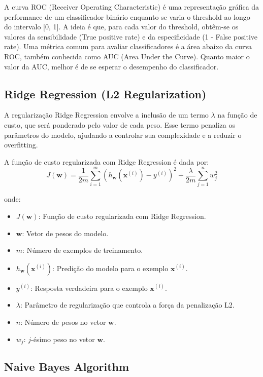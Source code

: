 \documentclass[conference]{IEEEtran}
\begin{document}
A curva ROC (Receiver Operating Characteristic) é uma representação gráfica da performance de um classificador binário enquanto se varia o threshold ao longo do intervalo [0, 1]. A ideia é que, para cada valor do threshold, obtêm-se os valores da sensibilidade (True positive rate) e da especificidade (1 - False positive rate). Uma métrica comum para avaliar classificadores é a área abaixo da curva ROC, também conhecida como AUC (Area Under the Curve). Quanto maior o valor da AUC, melhor é de se esperar o desempenho do classificador.


\subsection{Ridge Regression (L2 Regularization)}

A regularização Ridge Regression envolve a inclusão de um termo \(\lambda \) na função de custo, que será ponderado pelo valor de cada peso. Esse termo penaliza os parâmetros do modelo, ajudando a controlar sua complexidade e a reduzir o overfitting.

A função de custo regularizada com Ridge Regression é dada por:
\[ J(\mathbf{w}) = \frac{1}{2m} \sum_{i=1}^{m} (h_{\mathbf{w}}(\mathbf{x}^{(i)}) - y^{(i)})^2 + \frac{\lambda}{2m} \sum_{j=1}^{n} w_j^2 \]

onde:
\begin{itemize}
    \item \( J(\mathbf{w}) \): Função de custo regularizada com Ridge Regression.
    \item \( \mathbf{w} \): Vetor de pesos do modelo.
    \item \( m \): Número de exemplos de treinamento.
    \item \( h_{\mathbf{w}}(\mathbf{x}^{(i)}) \): Predição do modelo para o exemplo \( \mathbf{x}^{(i)} \).
    \item \( y^{(i)} \): Resposta verdadeira para o exemplo \( \mathbf{x}^{(i)} \).
    \item \( \lambda \): Parâmetro de regularização que controla a força da penalização L2.
    \item \( n \): Número de pesos no vetor \( \mathbf{w} \).
    \item \( w_j \): \( j \)-ésimo peso no vetor \( \mathbf{w} \).
\end{itemize}


\subsection{Naive Bayes Algorithm}
\end{document}

